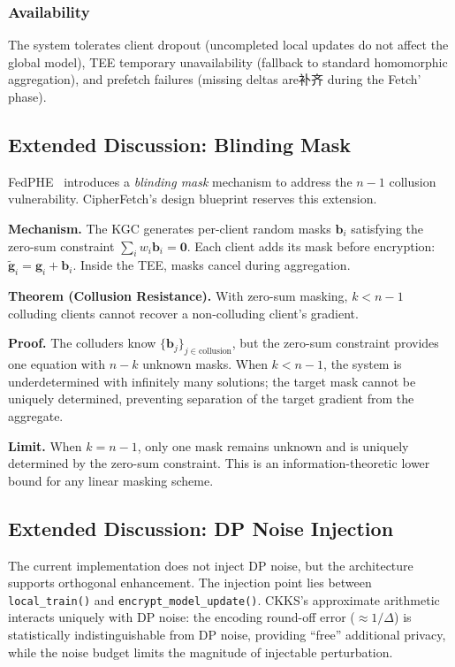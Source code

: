 \subsubsection{Availability}

The system tolerates client dropout (uncompleted local updates do not affect the global model), TEE temporary unavailability (fallback to standard homomorphic aggregation), and prefetch failures (missing deltas are补齐 during the Fetch' phase).

\subsection{Extended Discussion: Blinding Mask}
\label{subsec:blinding-mask}

FedPHE~\cite{li2025fedphe} introduces a \textit{blinding mask} mechanism to address the $n-1$ collusion vulnerability. CipherFetch's design blueprint reserves this extension.

\textbf{Mechanism.} The KGC generates per-client random masks $\mathbf{b}_i$ satisfying the zero-sum constraint $\sum_i w_i \mathbf{b}_i = \mathbf{0}$. Each client adds its mask before encryption: $\tilde{\mathbf{g}}_i = \mathbf{g}_i + \mathbf{b}_i$. Inside the TEE, masks cancel during aggregation.

\textbf{Theorem (Collusion Resistance).} With zero-sum masking, $k < n-1$ colluding clients cannot recover a non-colluding client's gradient.

\textbf{Proof.} The colluders know $\{\mathbf{b}_j\}_{j \in \text{collusion}}$, but the zero-sum constraint provides one equation with $n-k$ unknown masks. When $k < n-1$, the system is underdetermined with infinitely many solutions; the target mask cannot be uniquely determined, preventing separation of the target gradient from the aggregate.

\textbf{Limit.} When $k = n-1$, only one mask remains unknown and is uniquely determined by the zero-sum constraint. This is an information-theoretic lower bound for any linear masking scheme.

\subsection{Extended Discussion: DP Noise Injection}
\label{subsec:dp-extension}

The current implementation does not inject DP noise, but the architecture supports orthogonal enhancement. The injection point lies between \texttt{local\_train()} and \texttt{encrypt\_model\_update()}. CKKS's approximate arithmetic interacts uniquely with DP noise: the encoding round-off error ($\approx 1/\Delta$) is statistically indistinguishable from DP noise, providing ``free'' additional privacy, while the noise budget limits the magnitude of injectable perturbation.

